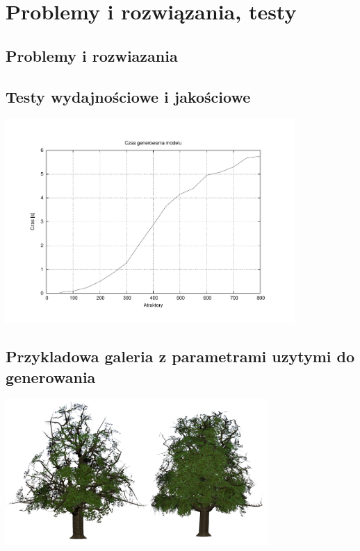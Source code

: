 
\chapter{Problemy i rozwiązania, testy}

\section{Problemy i rozwiazania}

\section{Testy wydajnościowe i jakościowe}

\begin{center}
	\includegraphics[width=110mm]{images/performance.pdf}
\end{center}


\section{Przykladowa galeria z parametrami uzytymi do generowania}

\begin{center}
	\includegraphics[width=100mm]{images/renders/greentree.png}
\end{center}

